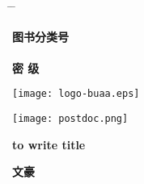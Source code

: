 \thispagestyle{empty}\setcounter{page}{0}

\begin{tabbing}
 \hspace*{0cm} \= \hspace{2.7cm} \= \kill

\underline{\hspace{0.85cm}{\sihao 10006}\hspace{0.85cm}}  \hskip4.1cm
  {\sihao\textbf{图书分类号}}\underline{\hspace{0.6cm}{\sihao O413}\hspace{0.6cm}}\\ %
  \\
\underline{\hspace{0.4cm}{\sihao B18066}\hspace{0.7cm}}  \hskip4.1cm
  {\sihao\textbf{密\hskip16.6mm 级}}\underline{\hspace{2.4cm}}
\end{tabbing}

\vspace{1.2cm}

\begin{center}
 \texttt{[image: logo-buaa.eps]}
\end{center}

\vspace{0.15cm}

\begin{center}
\texttt{[image: postdoc.png]}
\end{center}

\vspace{0.15cm}

\begin{center}{\erhao{}}
\end{center}

\vspace{0.05cm}

\begin{center}{\erhao\bf
to write title}\end{center}

\vspace{0.05cm}

\begin{center}{\xiaoerhao\song\boldmath\bf 文豪}\end{center}

\vspace{0.05cm}


